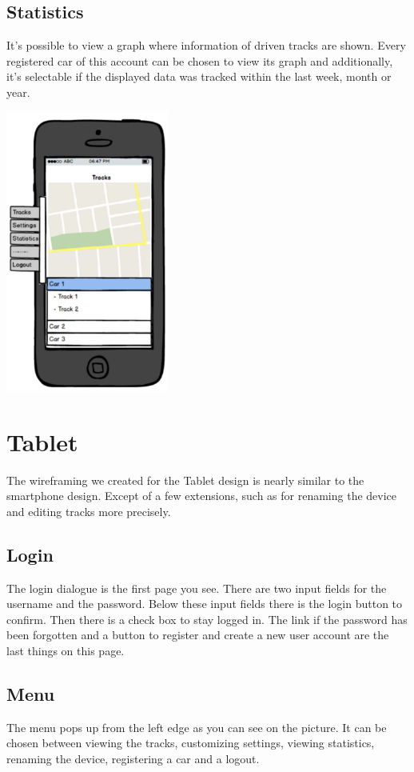 \subsection{Statistics}
It’s possible to view a graph where information of driven tracks are shown. Every registered car of this account can be chosen to view its graph and additionally, it’s selectable if the displayed data was tracked within the last week, month or year.
\begin{center}
\includegraphics[width=0.4\textwidth]{bilder/Smartphone}
\end{center}
\section{Tablet}
The wireframing we created for the Tablet design is nearly similar to the smartphone design. Except of a few extensions, such as for renaming the device and editing tracks more precisely.
\subsection{Login}
The login dialogue is the first page you see. There are two input fields for the username and the password. Below these input fields there is the login button to confirm. Then there is a check box to stay logged in.
The link if the password has been forgotten and a button to register and create a new user account are the last things on this page.
\subsection{Menu}
The menu pops up from the left edge as you can see on the picture. It can be chosen between viewing the tracks, customizing settings, viewing statistics, renaming the device, registering a car and a logout.
